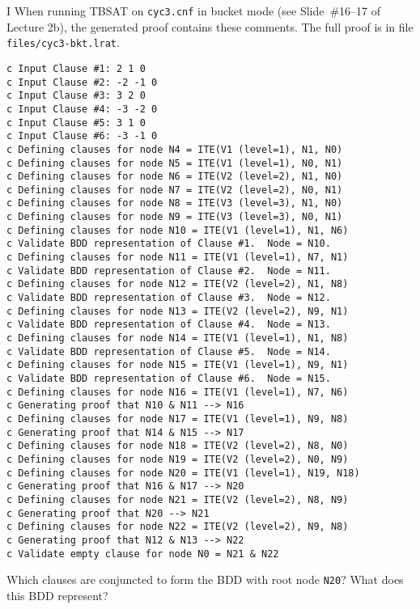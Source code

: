 \newpage

\begin{problem}{I}
When running TBSAT on \texttt{cyc3.cnf} in bucket mode (see Slide~\#16--17 of Lecture 2b), the generated proof contains these comments.
The full proof is in file \texttt{files/cyc3-bkt.lrat}.

\begin{lstlisting}
c Input Clause #1: 2 1 0
c Input Clause #2: -2 -1 0
c Input Clause #3: 3 2 0
c Input Clause #4: -3 -2 0
c Input Clause #5: 3 1 0
c Input Clause #6: -3 -1 0
c Defining clauses for node N4 = ITE(V1 (level=1), N1, N0)
c Defining clauses for node N5 = ITE(V1 (level=1), N0, N1)
c Defining clauses for node N6 = ITE(V2 (level=2), N1, N0)
c Defining clauses for node N7 = ITE(V2 (level=2), N0, N1)
c Defining clauses for node N8 = ITE(V3 (level=3), N1, N0)
c Defining clauses for node N9 = ITE(V3 (level=3), N0, N1)
c Defining clauses for node N10 = ITE(V1 (level=1), N1, N6)
c Validate BDD representation of Clause #1.  Node = N10.
c Defining clauses for node N11 = ITE(V1 (level=1), N7, N1)
c Validate BDD representation of Clause #2.  Node = N11.
c Defining clauses for node N12 = ITE(V2 (level=2), N1, N8)
c Validate BDD representation of Clause #3.  Node = N12.
c Defining clauses for node N13 = ITE(V2 (level=2), N9, N1)
c Validate BDD representation of Clause #4.  Node = N13.
c Defining clauses for node N14 = ITE(V1 (level=1), N1, N8)
c Validate BDD representation of Clause #5.  Node = N14.
c Defining clauses for node N15 = ITE(V1 (level=1), N9, N1)
c Validate BDD representation of Clause #6.  Node = N15.
c Defining clauses for node N16 = ITE(V1 (level=1), N7, N6)
c Generating proof that N10 & N11 --> N16
c Defining clauses for node N17 = ITE(V1 (level=1), N9, N8)
c Generating proof that N14 & N15 --> N17
c Defining clauses for node N18 = ITE(V2 (level=2), N8, N0)
c Defining clauses for node N19 = ITE(V2 (level=2), N0, N9)
c Defining clauses for node N20 = ITE(V1 (level=1), N19, N18)
c Generating proof that N16 & N17 --> N20
c Defining clauses for node N21 = ITE(V2 (level=2), N8, N9)
c Generating proof that N20 --> N21
c Defining clauses for node N22 = ITE(V2 (level=2), N9, N8)
c Generating proof that N12 & N13 --> N22
c Validate empty clause for node N0 = N21 & N22
\end{lstlisting}

\newpage
\begin{choice}
\item Which clauses are conjuncted to form the BDD with root node \texttt{N20}?  What does this BDD represent?


\end{choice}
\end{problem}
